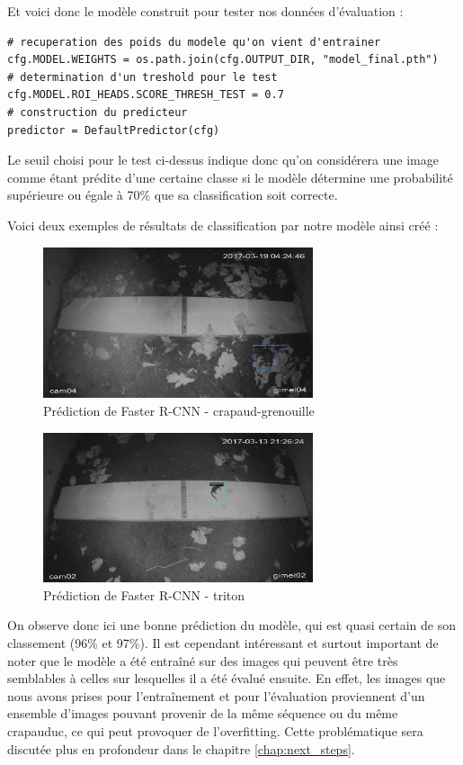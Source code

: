 Et voici donc le modèle construit pour tester nos données d'évaluation : 

\lstset{style=Python}
\begin{lstlisting}
# recuperation des poids du modele qu'on vient d'entrainer
cfg.MODEL.WEIGHTS = os.path.join(cfg.OUTPUT_DIR, "model_final.pth")  
# determination d'un treshold pour le test
cfg.MODEL.ROI_HEADS.SCORE_THRESH_TEST = 0.7  
# construction du predicteur
predictor = DefaultPredictor(cfg)
\end{lstlisting}

Le seuil choisi pour le test ci-dessus indique donc qu'on considérera une image comme étant prédite d'une certaine classe si le modèle détermine une probabilité supérieure ou égale à 70\% que sa classification soit correcte.\newline

Voici deux exemples de résultats de classification par notre modèle ainsi créé :

\begin{figure}[H]
    \centering
    \includegraphics[width=300px]{images/Eval_FasterRCNN_crapGren.png}
    \caption{Prédiction de Faster R-CNN - crapaud-grenouille}
    \label{fig:fasterRcnn_crapGren}
\end{figure}

\begin{figure}[H]
    \centering
    \includegraphics[width=300px]{images/Eval_FasterRCNN_triton.png}
    \caption{Prédiction de Faster R-CNN - triton}
    \label{fig:fasterRcnn_triton}
\end{figure}

On observe donc ici une bonne prédiction du modèle, qui est quasi certain de son classement (96\% et 97\%). Il est cependant intéressant et surtout important de noter que le modèle a été entraîné sur des images qui peuvent être très semblables à celles sur lesquelles il a été évalué ensuite. En effet, les images que nous avons prises pour l'entraînement et pour l'évaluation proviennent d'un ensemble d'images pouvant provenir de la même séquence ou du même crapauduc, ce qui peut provoquer de l'overfitting. Cette problématique sera discutée plus en profondeur dans le chapitre \ref{chap:next_steps}.

